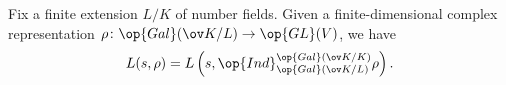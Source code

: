 \documentclass[../thesis.tex]{subfiles}
\begin{document}
\begin{lemma}[induction] \label{lem:artin-ind}
	Fix a finite extension $L/K$ of number fields. Given a finite-dimensional complex representation $\rho\colon\op{Gal}(\ov K/L)\to\op{GL}(V)$, we have
	\[L(s,\rho)=L\left(s,\op{Ind}_{\op{Gal}(\ov K/L)}^{\op{Gal}(\ov K/K)}\rho\right).\]
\end{lemma}
\end{document}
